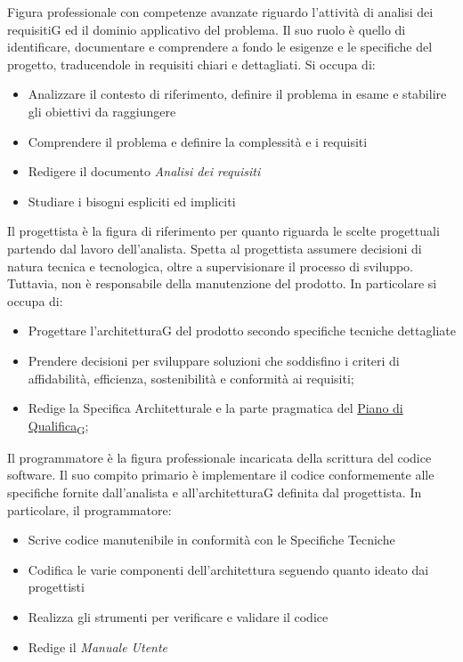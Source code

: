 Figura professionale con competenze avanzate riguardo l’attività di analisi dei requisitiG ed il dominio applicativo del problema. Il suo ruolo è quello di identificare, documentare e comprendere a fondo le esigenze e le specifiche del progetto, traducendole in requisiti chiari e dettagliati. Si occupa di:
\begin{itemize}
    \item Analizzare il contesto di riferimento, definire il problema in esame e stabilire gli obiettivi da raggiungere
    \item Comprendere il  problema e definire la complessità e i requisiti
    \item Redigere il documento \textit{Analisi dei requisiti}
    \item Studiare i bisogni espliciti ed impliciti
\end{itemize}
Il progettista è la figura di riferimento per quanto riguarda le scelte progettuali partendo dal lavoro dell’analista. Spetta al progettista assumere decisioni di natura tecnica e tecnologica, oltre a supervisionare il processo di sviluppo. Tuttavia, non è responsabile della manutenzione del prodotto.
In particolare si occupa di:
\begin{itemize}
    \item Progettare l’architetturaG del prodotto secondo specifiche tecniche dettagliate
    \item Prendere decisioni per sviluppare soluzioni che soddisfino i criteri di affidabilità,
    efficienza, sostenibilità e conformità ai requisiti;
    \item Redige la Specifica Architetturale e la parte pragmatica del \href{https://7last.github.io/docs/rtb/glossario#piano di qualifica}{Piano di Qualifica\textsubscript{G}};
\end{itemize}
Il programmatore è la figura professionale incaricata della scrittura del codice software. Il suo compito primario è implementare il codice conformemente alle specifiche fornite dall’analista e all’architetturaG definita dal progettista.
In particolare, il programmatore:
\begin{itemize}
    \item Scrive codice manutenibile in conformità con le Specifiche Tecniche
    \item Codifica le varie componenti dell’architettura seguendo quanto ideato dai progettisti
    \item Realizza gli strumenti per verificare e validare il codice
    \item Redige il \textit{Manuale Utente}
\end{itemize}
